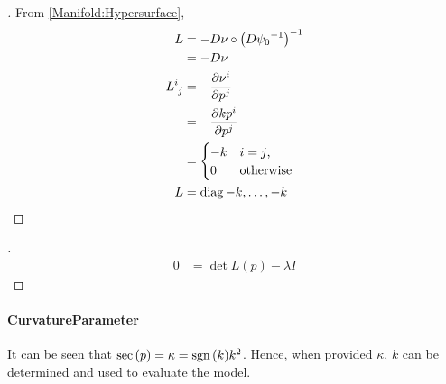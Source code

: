 \documentclass[../main.tex]{subfiles}
\begin{document}
\begin{proof}[]
    From \cref{Manifold:Hypersurface},
    \begin{align*}
        L
        & = - D\nu \circ \left(D{{\psi_0}^{-1}}\right)^{-1} \\
        & = - D\nu \\
        \tensor{L}{^i_j}
        & = - \frac{\partial \tensor{\nu}{^i}}{\partial \tensor{p}{^j}} \\
        & = - \frac{\partial k\tensor{p}{^i}}{\partial \tensor{p}{^j}} \\
        & = \begin{cases}
            - k & \text{$i=j$,} \\
            0 & \text{otherwise} \\
        \end{cases} \\
        L &= \diag{-k,\dots,-k}
    \end{align*}
\end{proof}
\begin{lemma}\label{Model:PrincipalCurvature}

\end{lemma}
\begin{proof}[]
    \begin{align*}
        0
        & = \det{L(p)-\lambda I}
    \end{align*}
\end{proof}
\paragraph{CurvatureParameter}
It can be seen that $\operatorname{sec}\left(p\right) = \kappa = \operatorname{sgn}{\left(k\right)}k^2$.
Hence, when provided $\kappa$, $k$ can be determined and used to evaluate the model.
\end{document}
